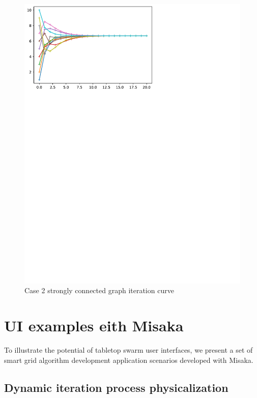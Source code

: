 \documentclass[conference]{IEEEtran}
\begin{document}
\begin{figure}[htbp]
    \centering
    \includegraphics[width=\columnwidth]{123456-Correct.pdf}
    \caption{Case 2 strongly connected graph iteration curve}
    \label{fig:123456-Correct}
\end{figure}






\section{UI examples eith Misaka}

To illustrate the potential of tabletop swarm user interfaces, we present a set of smart grid algorithm development application scenarios developed with Misaka.

\subsection{Dynamic iteration process physicalization}
\end{document}
